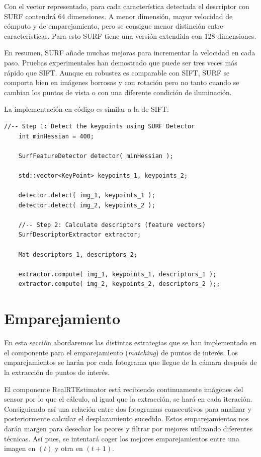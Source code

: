 Con el vector representado, para cada característica detectada el descriptor con SURF contendrá 64 dimensiones. A menor dimensión, mayor velocidad de cómputo y de emparejamiento, pero se consigue menor distinción entre características. Para esto SURF tiene una versión extendida con 128 dimensiones.

En resumen, SURF añade muchas mejoras para incrementar la velocidad en cada paso. Pruebas experimentales han demostrado que puede ser tres veces más rápido que SIFT. Aunque en robustez es comparable con SIFT, SURF se comporta bien en imágenes borrosas y con rotación pero no tanto cuando se cambian los puntos de vista o con una diferente condición de iluminación.

La implementación en código es similar a la de SIFT:

\begin{lstlisting}[style=CStyle]
	//-- Step 1: Detect the keypoints using SURF Detector
	int minHessian = 400;

	SurfFeatureDetector detector( minHessian );

	std::vector<KeyPoint> keypoints_1, keypoints_2;

	detector.detect( img_1, keypoints_1 );
	detector.detect( img_2, keypoints_2 );

	//-- Step 2: Calculate descriptors (feature vectors)
	SurfDescriptorExtractor extractor;

	Mat descriptors_1, descriptors_2;

	extractor.compute( img_1, keypoints_1, descriptors_1 );
	extractor.compute( img_2, keypoints_2, descriptors_2 );;
\end{lstlisting}



\section{Emparejamiento}

En esta sección abordaremos las distintas estrategias que se han implementado en el componente para el emparejamiento (\textit{matching}) de puntos de interés. Los emparejamientos se harán por cada fotograma que llegue de la cámara después de la extracción de puntos de interés.

El componente RealRTEstimator está recibiendo continuamente imágenes del sensor por lo que el cálculo, al igual que la extracción, se hará en cada iteración. Consiguiendo así una relación entre dos fotogramas consecutivos para analizar y posteriormente calcular el desplazamiento sucedido. Estos emparejamientos nos darán margen para desechar los peores y filtrar por mejores utilizando diferentes técnicas. Así pues, se intentará coger los mejores emparejamientos entre una imagen en $(t)$ y otra en $(t+1)$.

